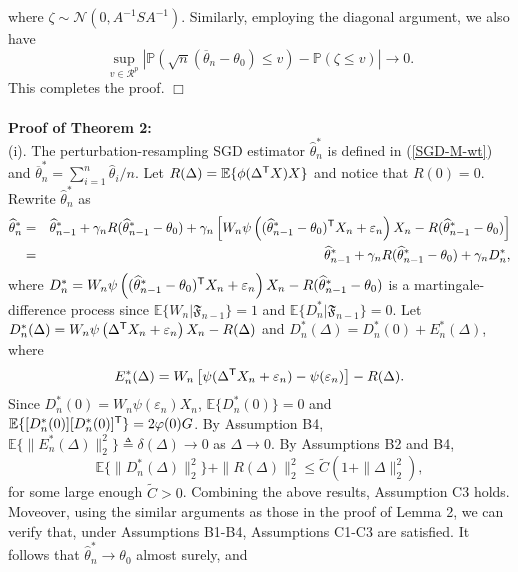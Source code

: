 \documentclass[12pt]{article}
\def\trans{^{\rm \textsf{T}}}
\def\wh{\widehat}
\def\ol{\overline}
\begin{document}
where $\zeta\sim\mathcal{N}(0, A^{-1}SA^{-1})$. Similarly, employing the diagonal argument, we also have
\begin{equation}\label{eq-co-2}
\sup_{v\in\mathcal{R}^p}\left|\mathbb{P}\left(\sqrt{n}(\ol{\theta}_n-\theta_0)\leq v\right)-\mathbb{P}(\zeta\leq v)\right| \rightarrow 0.
\end{equation}
This completes the proof. $\Box$\\
\\
{\bf {Proof of Theorem 2:}}\\
(i). The perturbation-resampling  SGD estimator $\wh{\theta}^*_n$ is defined in (\ref{SGD-M-wt}) and $\ol{\theta}_n^*=\sum_{i=1}^n\wh{\theta}_{i}/n$. Let $R(\Delta)=\mathbb{E}\{\phi(\Delta\trans X)X\}$ and notice that $R(0)=0$. Rewrite $\wh{\theta}^*_n$ as
\begin{eqnarray}\label{SGD-wt-rewrite}
\wh{\theta}^*_n&=&\wh{\theta}^*_{n-1}+\gamma_n R(\wh{\theta}^*_{n-1}-\theta_0)+\gamma_n\left[W_n\psi\left((\wh{\theta}^*_{n-1}-\theta_0)\trans X_n + \varepsilon_n\right)X_n-R(\wh{\theta}^*_{n-1}-\theta_0)\right]\nonumber\\
&=& \wh{\theta}^*_{n-1}+\gamma_n R(\wh{\theta}^*_{n-1}-\theta_0)+\gamma_n D^*_n,\label{SGD-M-wt-rewrite}
\end{eqnarray}
where $D^*_n=W_n\psi\left((\wh{\theta}^*_{n-1}-\theta_0)\trans X_n + \varepsilon_n\right)X_n-R(\wh{\theta}^*_{n-1}-\theta_0)$ is a martingale-difference process
since $\mathbb{E}\{W_n|\mathfrak{F}_{n-1}\}=1$ and $\mathbb{E}\{D^*_n|\mathfrak{F}_{n-1}\}=0$.
Let $D^*_n(\Delta)=W_n\psi\left(\Delta\trans X_n + \varepsilon_n\right)X_n-R(\Delta)$ and $D^*_n(\Delta)=D^*_n(0)+E^*_n(\Delta)$, where
\begin{equation}
E^*_n(\Delta)=W_n\left[\psi(\Delta\trans X_n+\varepsilon_n)-\psi(\varepsilon_n)\right]-R(\Delta).
\end{equation}
Since $D^*_n(0)=W_n\psi(\varepsilon_n)X_n$, $\mathbb{E}\{D^*_n(0)\}=0$ and $\mathbb{E}\{[D^*_n(0)][D^*_n(0)]\trans\}=2 \varphi(0)G$. By Assumption B4,  $\mathbb{E}\{\|E^*_n(\Delta)\|_2^2\}\triangleq\delta(\Delta)\rightarrow 0$ as $\Delta\rightarrow 0$. By Assumptions B2 and B4,
\begin{equation}\label{D-M-n}
\mathbb{E}\{\|D_n^*(\Delta)\|_2^2\}+\|R(\Delta)\|_2^2\leq \widetilde{C} (1+\|\Delta\|_2^2),
\end{equation}
for some large enough $\widetilde{C}>0$. Combining the above results, Assumption C3 holds. Moveover, using the similar arguments as those in the proof of Lemma 2, we can verify that, under Assumptions B1-B4, Assumptions  C1-C3 are satisfied. It follows that $\wh{\theta}^*_n\rightarrow\theta_0$ almost surely, and
\end{document}
